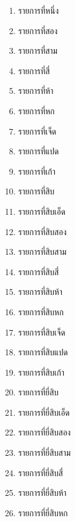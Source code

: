 \documentclass[11pt]{ltxguide}
\begin{document}
\begin{multicols}{4}
    \scriptsize
    \begin{enumerate}[listparindent=0pc,topsep=0pc,itemsep=0pc,label={\thaimultialph*.}]
        \item  รายการ{\wbr}ที่{\wbr}หนึ่ง{\wbr}
        \item  รายการ{\wbr}ที่{\wbr}สอง{\wbr}
        \item  รายการ{\wbr}ที่{\wbr}สาม{\wbr}
        \item  รายการ{\wbr}ที่{\wbr}สี่{\wbr}
        \item  รายการ{\wbr}ที่{\wbr}ห้า{\wbr}
        \item  รายการ{\wbr}ที่{\wbr}หก{\wbr}
        \item  รายการ{\wbr}ที่{\wbr}เจ็ด{\wbr}
        \item  รายการ{\wbr}ที่{\wbr}แปด{\wbr}
        \item  รายการ{\wbr}ที่{\wbr}เก้า{\wbr}
        \item  รายการ{\wbr}ที่{\wbr}สิบ{\wbr}
        \item  รายการ{\wbr}ที่{\wbr}สิบ{\wbr}เอ็ด{\wbr}
        \item  รายการ{\wbr}ที่{\wbr}สิบ{\wbr}สอง{\wbr}
        \item  รายการ{\wbr}ที่{\wbr}สิบ{\wbr}สาม{\wbr}
        \item  รายการ{\wbr}ที่{\wbr}สิบ{\wbr}สี่{\wbr}
        \item  รายการ{\wbr}ที่{\wbr}สิบ{\wbr}ห้า{\wbr}
        \item  รายการ{\wbr}ที่{\wbr}สิบ{\wbr}หก{\wbr}
        \item  รายการ{\wbr}ที่{\wbr}สิบ{\wbr}เจ็ด{\wbr}
        \item  รายการ{\wbr}ที่{\wbr}สิบ{\wbr}แปด{\wbr}
        \item  รายการ{\wbr}ที่{\wbr}สิบ{\wbr}เก้า{\wbr}
        \item  รายการ{\wbr}ที่{\wbr}ยี่{\wbr}สิบ{\wbr}
        \item  รายการ{\wbr}ที่{\wbr}ยี่{\wbr}สิบ{\wbr}เอ็ด{\wbr}
        \item  รายการ{\wbr}ที่{\wbr}ยี่{\wbr}สิบ{\wbr}สอง{\wbr}
        \item  รายการ{\wbr}ที่{\wbr}ยี่{\wbr}สิบ{\wbr}สาม{\wbr}
        \item  รายการ{\wbr}ที่{\wbr}ยี่{\wbr}สิบ{\wbr}สี่{\wbr}
        \item  รายการ{\wbr}ที่{\wbr}ยี่{\wbr}สิบ{\wbr}ห้า{\wbr}
        \item  รายการ{\wbr}ที่{\wbr}ยี่{\wbr}สิบ{\wbr}หก{\wbr}

\end{enumerate}
\end{multicols}
\end{document}
